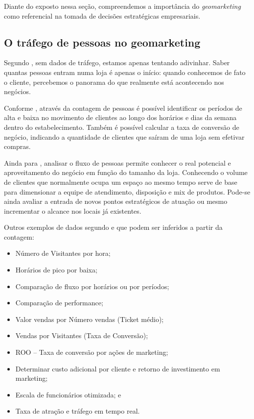 Diante do exposto nessa seção, compreendemos a importância do \emph{geomarketing} como
referencial na tomada de decisões estratégicas empresariais.

\subsection{O tráfego de pessoas no geomarketing}

Segundo , sem dados de tráfego, estamos apenas tentando adivinhar. Saber quantas pessoas entram numa loja é apenas o início: quando conhecemos de fato o cliente, percebemos o panorama do que realmente está acontecendo nos negócios.

Conforme , através da contagem de pessoas é possível identificar os períodos de alta e baixa no movimento de clientes ao longo dos horários e dias da semana dentro do estabelecimento. Também é possível calcular a taxa de conversão de negócio, indicando a quantidade de clientes que saíram de uma loja sem efetivar compras.

Ainda para , analisar o fluxo de pessoas permite conhecer o real potencial e aproveitamento do negócio em função do tamanho da loja. Conhecendo o volume de clientes que normalmente ocupa um espaço ao mesmo tempo serve de base para dimensionar a equipe de atendimento, disposição e mix de produtos. Pode-se ainda avaliar a entrada de novos pontos estratégicos de atuação ou mesmo incrementar o alcance nos locais já existentes.

Outros exemplos de dados segundo  e  que podem ser inferidos a partir da contagem:

\begin{itemize}
  \item Número de Visitantes por hora;
  \item Horários de pico por baixa;
  \item Comparação de fluxo por horários ou por períodos;
  \item Comparação de performance;
  \item Valor vendas por Número vendas (Ticket médio);
  \item Vendas por Visitantes (Taxa de Conversão);
  \item ROO – Taxa de conversão por ações de marketing;
  \item Determinar custo adicional por cliente e retorno de investimento em marketing;
  \item Escala de funcionários otimizada; e
  \item Taxa de atração e tráfego em tempo real.
\end{itemize}

